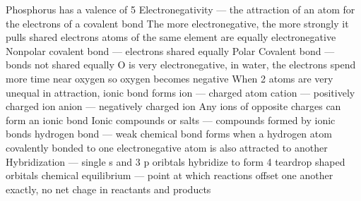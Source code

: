 \documentclass[../main.tex]{subfiles}
\begin{document}
\begin{outline}
	\3 Phosphorus has a valence of 5
	\1 Electronegativity --- the attraction of an atom for the electrons of a covalent bond
	\2 The more electronegative, the more strongly it pulls shared electrons
	 atoms of the same element are equally electronegative
	\1 Nonpolar covalent bond --- electrons shared equally
	\2 Polar Covalent bond --- bonds not shared equally
	\3 O is very electronegative, in water, the electrons spend more time near oxygen so oxygen becomes negative
	\1 When 2 atoms are very unequal in attraction, ionic bond forms
	\1 ion --- charged atom
	\1 cation --- positively charged ion
	\1 anion --- negatively charged ion
	\1 Any ions of opposite charges can form an ionic bond
	\1 Ionic compounds or salts --- compounds formed by ionic bonds
	\1 hydrogen bond --- weak chemical bond
	\2 forms when a hydrogen atom covalently bonded to one electronegative atom is also attracted to another
	\1 Hybridization --- single s and 3 p oribtals hybridize to form 4 teardrop shaped orbitals
	\1 chemical equilibrium --- point at which reactions offset one another exactly, no net chage in reactants and products
\end{outline}
\end{document}
